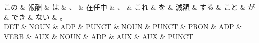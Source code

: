 \documentclass[tikz,border=5pt]{standalone}
\begin{document}
\normalsize
\begin{dependency}[edge unit distance=12.0pt]
    \begin{deptext}[column sep=1em]
        この \& 報酬 \& は \& 、 \& 在任中 \& 、 \& これ \& を \& 減額 \& する \& こと \& が \& でき \& ない \& 。\\
        DET \& NOUN \& ADP \& PUNCT \& NOUN \& PUNCT \& PRON \& ADP \& VERB \& AUX \& NOUN \& ADP \& AUX \& AUX \& PUNCT\\
    \end{deptext}
\end{dependency}
\end{document}
